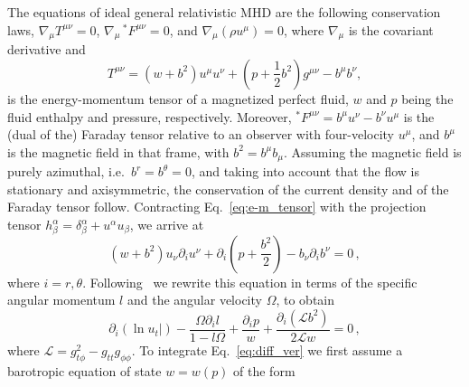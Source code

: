 \documentclass{aa}
\begin{document}
The equations of ideal general relativistic MHD are the following conservation laws, $\nabla_{\mu} T^{\mu\nu} = 0$, $\nabla_{\mu} \,^\ast F^{\mu\nu} = 0$, and 
$\nabla_{\mu} (\rho u^{\mu}) = 0$, 
where $\nabla_{\mu}$ is the covariant derivative and
\begin{equation}\label{eq:e-m_tensor}
T^{\mu\nu} = (w + b^2)u^{\mu}u^{\nu} + \left(p + \frac{1}{2}b^2\right)g^{\mu\nu} - b^{\mu}b^{\nu},
\end{equation}
is the energy-momentum tensor of a magnetized perfect fluid, $w$ and $p$ being the fluid enthalpy and pressure, respectively. 
Moreover,
$^\ast F^{\mu\nu} = b^{\mu}u^{\nu} - b^{\nu}u^{\mu}$
is the (dual of the) Faraday tensor relative to an observer with four-velocity $u^{\mu}$, and $b^{\mu}$ is the magnetic field in that frame, with
$b^2=b^{\mu}b_{\mu}$. Assuming the magnetic field is purely azimuthal, i.e.~$b^r = b^{\theta} = 0$,
and taking into account that the flow is stationary and axisymmetric, the conservation of the current density and of the Faraday tensor follow. Contracting Eq.~\eqref{eq:e-m_tensor} with the projection tensor $h^{\alpha}_{\beta} = \delta^{\alpha}_{\beta} + u^{\alpha}u_{\beta}$, we arrive at
\begin{equation}
(w + b^2)u_{\nu}\partial_i u^{\nu} + \partial_i\left(p + \frac{b^2}{2}\right) - b_{\nu}\partial_i b^{\nu}=0\,,
\end{equation}
where $i = r, \theta$. Following~\cite{Komissarov:2006} we rewrite this equation in terms of the specific angular momentum $l$ and the angular velocity $\Omega$, to obtain
\begin{equation}\label{eq:diff_ver}
\partial_i(\ln u_t|) - \frac{\Omega \partial_i l}{1-l\Omega} + \frac{\partial_i p}{w} + \frac{\partial_i(\mathcal{L}b^2)}{2\mathcal{L}w} = 0\,,
\end{equation}
where $\mathcal{L} = g_{t\phi}^2 - g_{tt}g_{\phi\phi}$.
To integrate Eq.~\eqref{eq:diff_ver} we first assume a barotropic equation of state $w = w(p)$ of the form
\end{document}
